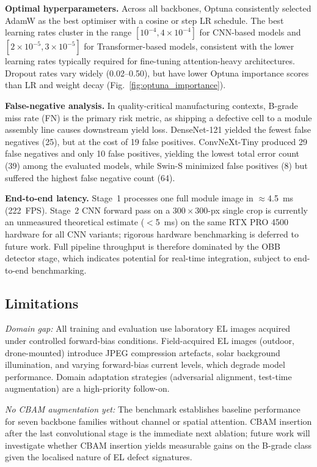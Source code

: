 \documentclass[conference]{IEEEtran}
\begin{document}
\textbf{Optimal hyperparameters.} Across all backbones, Optuna consistently selected AdamW as the best optimiser with a cosine or step LR schedule. The best learning rates cluster in the range $[10^{-4}, 4×10^{-4}]$ for CNN-based models and $[2×10^{-5}, 3×10^{-5}]$ for Transformer-based models, consistent with the lower learning rates typically required for fine-tuning attention-heavy architectures. Dropout rates vary widely (0.02--0.50), but have lower Optuna importance scores than LR and weight decay (Fig.~\ref{fig:optuna_importance}).

\textbf{False-negative analysis.} In quality-critical manufacturing contexts, B-grade miss rate (FN) is the primary risk metric, as shipping a defective cell to a module assembly line causes downstream yield loss. DenseNet-121 yielded the fewest false negatives (25), but at the cost of 19 false positives. ConvNeXt-Tiny produced 29 false negatives and only 10 false positives, yielding the lowest total error count (39) among the evaluated models, while Swin-S minimized false positives (8) but suffered the highest false negative count (64).

\textbf{End-to-end latency.} Stage~1 processes one full module image in $\approx$4.5~ms (222~FPS). Stage~2 CNN forward pass on a $300\times300$-px single crop is currently an unmeasured theoretical estimate ($<$5~ms) on the same RTX PRO 4500 hardware for all CNN variants; rigorous hardware benchmarking is deferred to future work. Full pipeline throughput is therefore dominated by the OBB detector stage, which indicates potential for real-time integration, subject to end-to-end benchmarking.

\subsection{Limitations}

\textit{Domain gap:} All training and evaluation use laboratory EL images acquired under controlled forward-bias conditions. Field-acquired EL images (outdoor, drone-mounted) introduce JPEG compression artefacts, solar background illumination, and varying forward-bias current levels, which degrade model performance. Domain adaptation strategies (adversarial alignment, test-time augmentation) are a high-priority follow-on.

\textit{No CBAM augmentation yet:} The benchmark establishes baseline performance for seven backbone families without channel or spatial attention. CBAM insertion after the last convolutional stage is the immediate next ablation; future work will investigate whether CBAM insertion yields measurable gains on the B-grade class given the localised nature of EL defect signatures.
\end{document}
